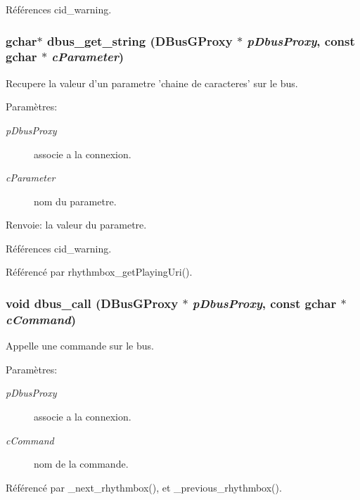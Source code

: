 Références cid\_\-warning.
\subsubsection{\setlength{\rightskip}{0pt plus 5cm}gchar$\ast$ dbus\_\-get\_\-string (DBusGProxy $\ast$ {\em pDbusProxy}, \/  const gchar $\ast$ {\em cParameter})}\label{cid-dbus_8h_4bcef2ba58371bec044bbe2c319a9101}


Recupere la valeur d'un parametre 'chaine de caracteres' sur le bus. \begin{Desc}
\item[Paramètres:]
\begin{description}
\item[{\em pDbusProxy}]associe a la connexion. \item[{\em cParameter}]nom du parametre. \end{description}
\end{Desc}
\begin{Desc}
\item[Renvoie:]la valeur du parametre. \end{Desc}


Références cid\_\-warning.

Référencé par rhythmbox\_\-getPlayingUri().
\subsubsection{\setlength{\rightskip}{0pt plus 5cm}void dbus\_\-call (DBusGProxy $\ast$ {\em pDbusProxy}, \/  const gchar $\ast$ {\em cCommand})}\label{cid-dbus_8h_9c0feee625a42e23e7882823c9194123}


Appelle une commande sur le bus. \begin{Desc}
\item[Paramètres:]
\begin{description}
\item[{\em pDbusProxy}]associe a la connexion. \item[{\em cCommand}]nom de la commande. \end{description}
\end{Desc}


Référencé par \_\-next\_\-rhythmbox(), et \_\-previous\_\-rhythmbox().
